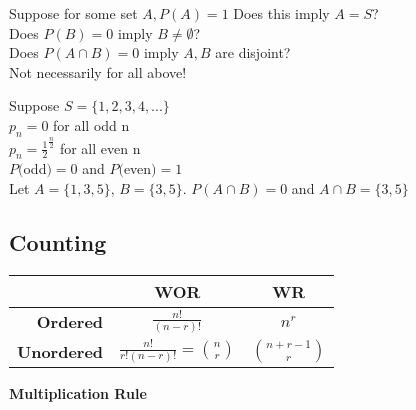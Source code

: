 \documentclass[12pt, oneside, letterpaper]{notes}
\begin{document}
\begin{myex}
\begin{remark}
	\noindent Suppose for some set $A, P(A) = 1$ Does this imply $A=S$? \\
	Does $P(B) = 0$ imply $B \neq \emptyset$? \\
	Does $P(A \cap B) = 0$ imply $A,B$ are disjoint? \\
	Not necessarily for all above! \\
	\vspace{3pt}
	
	\noindent Suppose $S = \{1,2,3,4,... \}$ \\
	$p_n = 0$ for all odd n \\
	$p_n = \frac{1}{2}^{\frac{n}{2}}$ for all even n \\
	$P($odd$) = 0$ and $P($even$) = 1$ \\
	Let $A=\{1,3,5\}$, $B=\{3,5\}$.  $P(A \cap B) = 0$ and $A \cap B = \{3,5\}$

\end{remark}

\end{myex}

\subsection{Counting}

\begin{table}[h!]
	\begin{center}
		\begin{tabular}{r|c|c}
			& \textbf{WOR} & \textbf{WR} \\
			\hline
			
			\textbf{Ordered} 
			& $\displaystyle \frac{n!}{(n-r)!} $ 
			& $\displaystyle n^r $ \\
			
			\textbf{Unordered} 
			& $\displaystyle \frac{n!}{r!(n-r)!} 
			= {n \choose r} $ 
			& $\displaystyle {n+r-1 \choose r} $ \\

		\end{tabular}
	\end{center}
\end{table}


\begin{mydef}
	\textbf{Multiplication Rule} 
\end{mydef}	
\end{document}
